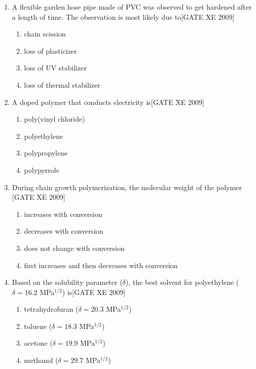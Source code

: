 \documentclass[journal,12pt,onecolumn]{IEEEtran}
\theoremstyle{remark}
\begin{document}
\begin{enumerate}
\begin{enumerate}
\begin{enumerate}[label=\textbf{Q.\arabic*.},  wide=0pt, leftmargin=*]
   \item A flexible garden hose pipe made of PVC was observed to get hardened after a length of time. The observation is most likely due to\hfill[GATE XE 2009]
   \begin{multicols}{2}
    \begin{enumerate}
        \item chain scission 
        \item loss of plasticizer 
        \item loss of UV stabilizer 
        \item loss of thermal stabilizer
    \end{enumerate}
    \end{multicols}

    \item A doped polymer that conducts electricity is\hfill[GATE XE 2009]
    \begin{multicols}{2}
    \begin{enumerate}
        \item poly(vinyl chloride) 
        \item polyethylene 
        \item polypropylene 
        \item polypyrrole
    \end{enumerate}
    \end{multicols}

   \item During chain growth polymerization, the molecular weight of the polymer
    \hfill[GATE XE 2009]
   \begin{multicols}{2}
    \begin{enumerate}
        \item increases with conversion 
        \item decreases with conversion 
        \item does not change with conversion 
        \item first increases and then decreases with conversion
    \end{enumerate}
    \end{multicols}

   \item  Based on the solubility parameter ($\delta$), the best solvent for polyethylene ($\delta = 16.2$ MPa$^{1/2}$) is\hfill[GATE XE 2009]
   \begin{multicols}{2}
    \begin{enumerate}
        \item tetrahydrofuran ($\delta = 20.3$ MPa$^{1/2}$) 
        \item toluene ($\delta = 18.3$ MPa$^{1/2}$) 
        \item acetone ($\delta = 19.9$ MPa$^{1/2}$)
        \item methanol ($\delta = 29.7$ MPa$^{1/2}$)\
    \end{enumerate}
    \end{multicols}


\end{enumerate}
\end{enumerate}
\end{enumerate}
\end{document}
